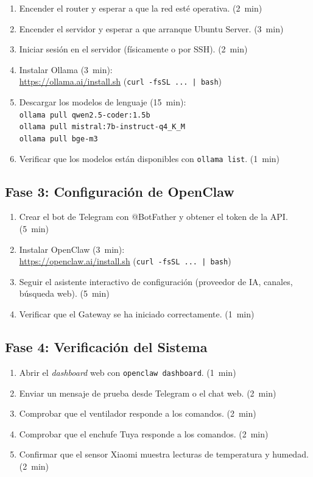 \begin{enumerate}
    \item Encender el router y esperar a que la red esté operativa. \hfill (2~min)
    \item Encender el servidor y esperar a que arranque Ubuntu Server. \hfill (3~min)
    \item Iniciar sesión en el servidor (físicamente o por SSH). \hfill (2~min)
    \item Instalar Ollama (3~min):\\ \url{https://ollama.ai/install.sh} (\texttt{curl -fsSL ... | bash})
    \item Descargar los modelos de lenguaje (15~min):\\ \texttt{ollama pull qwen2.5-coder:1.5b}\\ \texttt{ollama pull mistral:7b-instruct-q4\_K\_M}\\ \texttt{ollama pull bge-m3}
    \item Verificar que los modelos están disponibles con \texttt{ollama list}. \hfill (1~min)
\end{enumerate}

\subsection{Fase 3: Configuración de OpenClaw}

\begin{enumerate}
    \item Crear el bot de Telegram con @BotFather y obtener el token de la API. \hfill (5~min)
    \item Instalar OpenClaw (3~min):\\ \url{https://openclaw.ai/install.sh} (\texttt{curl -fsSL ... | bash})
    \item Seguir el asistente interactivo de configuración (proveedor de IA, canales, búsqueda web). \hfill (5~min)
    \item Verificar que el Gateway se ha iniciado correctamente. \hfill (1~min)
\end{enumerate}

\subsection{Fase 4: Verificación del Sistema}

\begin{enumerate}
    \item Abrir el \textit{dashboard} web con \texttt{openclaw dashboard}. \hfill (1~min)
    \item Enviar un mensaje de prueba desde Telegram o el chat web. \hfill (2~min)
    \item Comprobar que el ventilador responde a los comandos. \hfill (2~min)
    \item Comprobar que el enchufe Tuya responde a los comandos. \hfill (2~min)
    \item Confirmar que el sensor Xiaomi muestra lecturas de temperatura y humedad. \hfill (2~min)
\end{enumerate}

